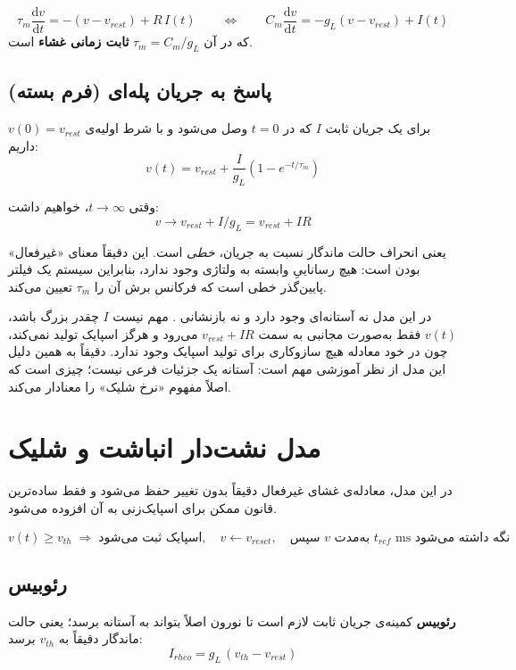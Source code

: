 \documentclass[11pt,a4paper]{article}
\newcommand{\dd}{\mathrm{d}}
\begin{document}
\begin{eqbox}
	$$\tau_m \frac{\dd v}{\dd t} = -(v - v_{rest}) + R\,I(t) \qquad\Longleftrightarrow\qquad C_m \frac{\dd v}{\dd t} = -g_L(v - v_{rest}) + I(t)$$
	که در آن
	$\tau_m = C_m/g_L$
	\textbf{ثابت زمانی غشاء} است.
\end{eqbox}

\subsection{پاسخ به جریان پله‌ای (فرم بسته)}
برای یک جریان ثابت $I$ که در $t=0$ وصل می‌شود و با شرط اولیه‌ی $v(0)=v_{rest}$ داریم:
$$v(t) = v_{rest} + \frac{I}{g_L}\left(1 - e^{-t/\tau_m}\right)$$

وقتی $t \to \infty$، خواهیم داشت:
$$v \to v_{rest} + I/g_L = v_{rest} + IR$$

یعنی انحراف حالت ماندگار نسبت به جریان، \emph{خطی} است. این دقیقاً معنای «غیرفعال» بودن است: هیچ رساناییِ وابسته به ولتاژی وجود ندارد، بنابراین سیستم یک فیلتر پایین‌گذر خطی است که فرکانس برش آن را $\tau_m$ تعیین می‌کند.

\begin{keybox}
	در این مدل نه آستانه‌ای وجود دارد و نه بازنشانی . مهم نیست $I$ چقدر بزرگ باشد، $v(t)$ فقط به‌صورت مجانبی به سمت $v_{rest}+IR$ می‌رود و هرگز اسپایک تولید نمی‌کند، چون در خود معادله هیچ سازوکاری برای تولید اسپایک وجود ندارد. دقیقاً به همین دلیل این مدل از نظر آموزشی مهم است: آستانه یک جزئیات فرعی نیست؛ چیزی است که اصلاً مفهوم «نرخ شلیک» را معنادار می‌کند.
\end{keybox}

\section{مدل نشت‌دار انباشت و شلیک }
در این مدل، معادله‌ی غشای غیرفعال دقیقاً بدون تغییر حفظ می‌شود و فقط ساده‌ترین قانون ممکن برای اسپایک‌زنی به آن افزوده می‌شود.

\begin{eqbox}
	$$v(t) \geq v_{th} \;\Longrightarrow\; \text{اسپایک ثبت می‌شود}, \quad v \leftarrow v_{reset}, \quad \text{سپس } v \text{ به‌مدت } t_{ref}\text{ ms نگه داشته می‌شود}$$
\end{eqbox}

\subsection{رئوبیس}
\textbf{رئوبیس} کمینه‌ی جریان ثابت لازم است تا نورون اصلاً بتواند به آستانه برسد؛ یعنی حالت ماندگار دقیقاً به $v_{th}$ برسد:
$$I_{rheo} = g_L\,(v_{th} - v_{rest})$$
\end{document}
